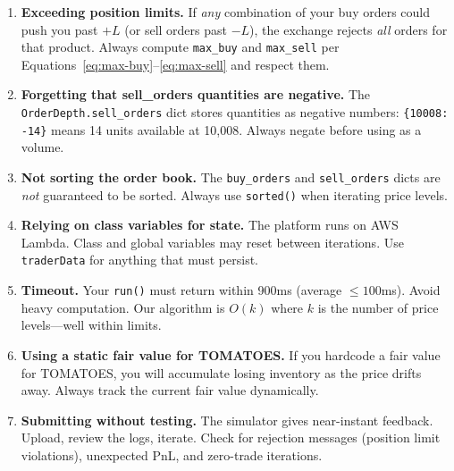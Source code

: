 \documentclass[11pt, letterpaper]{article}
\begin{document}
\begin{enumerate}[label=\textbf{\arabic*.}]

    \item \textbf{Exceeding position limits.}
    If \emph{any} combination of your buy orders could push you past $+L$ (or sell orders past $-L$), the exchange rejects \emph{all} orders for that product. Always compute \texttt{max\_buy} and \texttt{max\_sell} per Equations~\ref{eq:max-buy}--\ref{eq:max-sell} and respect them.

    \item \textbf{Forgetting that sell\_orders quantities are negative.}
    The \texttt{OrderDepth.sell\_orders} dict stores quantities as negative numbers: \texttt{\{10008: -14\}} means 14 units available at 10{,}008. Always negate before using as a volume.

    \item \textbf{Not sorting the order book.}
    The \texttt{buy\_orders} and \texttt{sell\_orders} dicts are \emph{not} guaranteed to be sorted. Always use \texttt{sorted()} when iterating price levels.

    \item \textbf{Relying on class variables for state.}
    The platform runs on AWS Lambda. Class and global variables may reset between iterations. Use \texttt{traderData} for anything that must persist.

    \item \textbf{Timeout.}
    Your \texttt{run()} must return within 900ms (average $\leq 100$ms). Avoid heavy computation. Our algorithm is $O(k)$ where $k$ is the number of price levels---well within limits.

    \item \textbf{Using a static fair value for TOMATOES.}
    If you hardcode a fair value for TOMATOES, you will accumulate losing inventory as the price drifts away. Always track the current fair value dynamically.

    \item \textbf{Submitting without testing.}
    The simulator gives near-instant feedback. Upload, review the logs, iterate. Check for rejection messages (position limit violations), unexpected PnL, and zero-trade iterations.

\end{enumerate}


\end{document}
